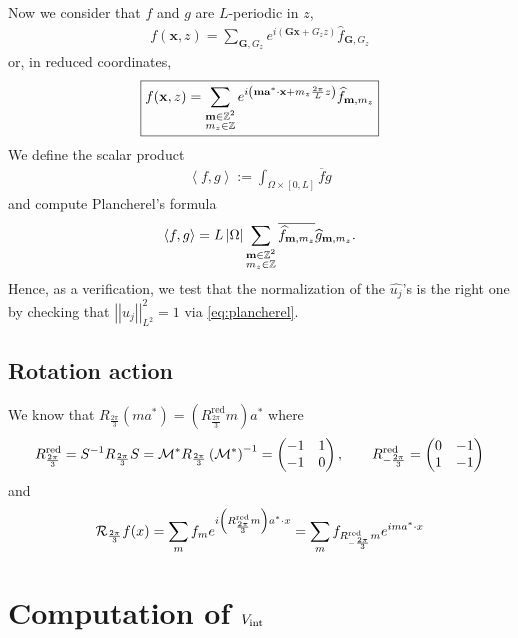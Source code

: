 \documentclass[11pt,a4paper,reqno,french,tikz]{amsart}
\newcommand{\pa}[1]{\left( #1 \right)} %
\newcommand{\ab}[1]{\left|#1\right|} %
\newcommand{\ps}[1]{\left< #1 \right>} %
\newcommand{\nor}[2]{ \left| \! \left| #1 \right| \! \right|_{#2} } %
\newcommand{\f}[2]{\frac{#1}{#2}} %
\newcommand{\ind}[1]{_{\textup{#1}}} %
\newcommand{\mat}[1]{\begin{pmatrix} #1 \end{pmatrix}} %
\def\bG{{\mathbf G}}
\def\ba{{\mathbf a}}
\def\bx{{\mathbf x}}
\def\bmm{{\mathbf m}}
\begin{document}
Now we consider that $f$ and $g$ are $L$-periodic in $z$,
\begin{align*}
f(\bx,z) = \sum_{\bG,G_z} e^{i\pa{\bG \bx + G_z z}} \widehat{f}_{\bG,G_z}
\end{align*}
or, in reduced coordinates,
\begin{align}\label{eq:dec_four}
\boxed{f(\bx,z) =  \sum_{\substack{\bmm \in \Z^2 \\ m_z \in \Z}}  e^{i\pa{\bmm \ba^* \cdot \bx + m_z \f{2\pi}L z}} \widehat{f}_{\bmm,m_z}}
\end{align}
We define the scalar product
\begin{align*}
\ps{f,g} := \int_{\Omega\times [0,L]} \overline{f}g
\end{align*}
and compute Plancherel's formula
\begin{align}\label{eq:plancherel}
\ps{f,g} = L\ab{\Omega} \sum_{\substack{\bmm \in \Z^2 \\ m_z \in \Z}} \overline{\widehat{f}_{\bmm,m_z}} \widehat{g}_{\bmm,m_z}.
\end{align}
Hence, as a verification, we test that the normalization of the $\widehat{u_j}$'s is the right one by checking that $\nor{u_j}{L^2}^2 = 1$ via \eqref{eq:plancherel}.

\subsection{Rotation action}%
\label{sub:rotation_action}


We know that $R_{\f{2\pi}3} \pa{ma^* } = \pa{R_{\f{2\pi}3}^{\text{red}} m} a^*$ where
\begin{align*}
	R_{\f{2\pi}3}^{\text{red}} = S^{-1} R_{\f{2\pi}3} S =  \cM^* R_{\f{2\pi}3} \pa{\cM^*}^{-1} = \mat{-1 & 1 \\ -1 & 0}, \qquad R_{-\f{2\pi}3}^{\text{red}} = \mat{0 & -1 \\ 1 & -1}
\end{align*}
and
\begin{align*}
\cR_{\f{2\pi}3} f(x) = \sum_m f_m e^{i \pa{R_{\f{2\pi}3}^{\text{red}} m} a^* \cdot x} = \sum_m f_{R_{-\f{2\pi}3}^{\text{red}} m} e^{im a^* \cdot x}
\end{align*}

\section{Computation of $V\ind{int}$}%
\label{sec:computation_of_vint_}
\end{document}
